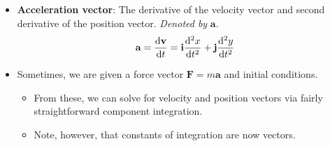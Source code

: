 \documentclass[../main.tex]{subfiles}
\begin{document}
\begin{itemize}
\begin{figure}[H]
        \caption{Velocity vector.}
        \label{fig:velocityVector}
    \end{figure}
    \begin{itemize}
        \item \cite{bib:Thomas} semi-rigorously proves from Figure \ref{fig:velocityVector} that if $\textbf{R}$ is the position vector, then $\dv*{\textbf{R}}{t}$ is the velocity vector.
        \item Essentially, he proves that
        \begin{equation*}
            \dv{\textbf{R}}{t} = \textbf{i}\dv{x}{t}+\textbf{j}\dv{y}{t}
        \end{equation*}
        It follows from this that
        \begin{align*}
            \text{slope of }\dv{\textbf{R}}{t} &= \frac{\textbf{j}\text{-component}}{\textbf{i}\text{-component}}
            = \frac{\dv*{y}{t}}{\dv*{x}{t}}
            = \dv{y}{x}\\
            \left| \dv{R}{t} \right| &= \left| \textbf{i}\dv{x}{t}+\textbf{j}\dv{y}{t} \right|
            = \sqrt{\left( \dv{x}{t} \right)^2+\left( \dv{y}{t} \right)^2}
            = \left| \dv{s}{t} \right|
        \end{align*}
    \end{itemize}
    \item \textbf{Acceleration vector}: The derivative of the velocity vector and second derivative of the position vector. \emph{Denoted by} $\textbf{a}$.
    \begin{equation*}
        \textbf{a} = \dv{\textbf{v}}{t} = \textbf{i}\dv[2]{x}{t}+\textbf{j}\dv[2]{y}{t}
    \end{equation*}
    \item Sometimes, we are given a force vector $\textbf{F}=m\textbf{a}$ and initial conditions.
    \begin{itemize}
        \item From these, we can solve for velocity and position vectors via fairly straightforward component integration.
        \item Note, however, that constants of integration are now vectors.
    \end{itemize}
\end{itemize}
\end{document}
